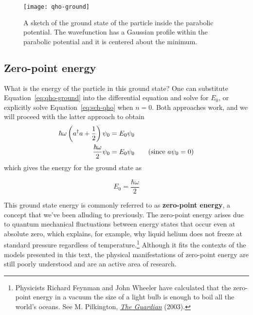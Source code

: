 \begin{figure}[!h]
	\centering
	\texttt{[image: qho-ground]}
	\caption{A sketch of the ground state of the particle inside the parabolic potential. The wavefunction has a Gaussian profile within the parabolic potential and it is centered about the minimum.}
	\label{fig:qho-ground}
\end{figure}


\subsection{Zero-point energy}
What is the energy of the particle in this ground state? One can substitute Equation~\ref{eq:qho-ground} into the differential equation and solve for $E_0$, or explicitly solve Equation~\ref{eq:sch-qho} when $n=0$. Both approaches work, and we will proceed with the latter approach to obtain
\begin{align*}
	\hbar\omega \left(a^{\dagger} a + \frac{1}{2} \right)\psi_0 &= E_0\psi_0 \\
	\frac{\hbar\omega}{2}\psi_0 &= E_0\psi_0 \tag{since $a\psi_0=0$}
\end{align*}
which gives the energy for the ground state as
\begin{tcolorbox}[title = Zero-point energy] \vspace{-2ex}
	\begin{equation}
		E_0 = \frac{\hbar\omega}{2} \label{eq:zpe}
	\end{equation}
\end{tcolorbox}

This ground state energy is commonly referred to as \textbf{zero-point energy}, a concept that we've been alluding to previously. The zero-point energy arises due to quantum mechanical fluctuations between energy states that occur even at absolute zero, which explains, for example, why liquid helium does not freeze at standard pressure regardless of temperature.\footnote{Physicists Richard Feynman and John Wheeler have calculated that the zero-point energy in a vacuum the size of a light bulb is enough to boil all the world's oceans. See M. Pilkington, \href{https://www.theguardian.com/education/2003/jul/17/research.highereducation}{\emph{The Guardian}} (2003).} Although it fits the contexts of the models presented in this text, the physical manifestations of zero-point energy are still poorly understood and are an active area of research. \par 

